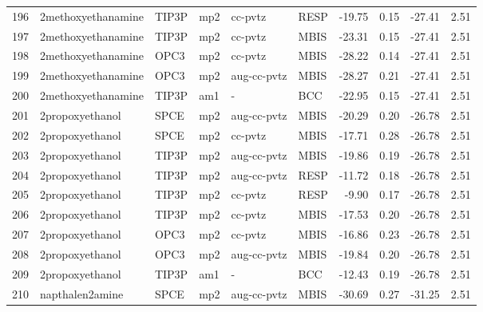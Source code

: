 \begin{tabular}{llllllrrrr}
196 &             2methoxyethanamine &      TIP3P &      mp2 &      cc-pvtz &         RESP & -19.75 &      0.15 &      -27.41 &     2.51 \\
197 &             2methoxyethanamine &      TIP3P &      mp2 &      cc-pvtz &         MBIS & -23.31 &      0.15 &      -27.41 &     2.51 \\
198 &             2methoxyethanamine &       OPC3 &      mp2 &      cc-pvtz &         MBIS & -28.22 &      0.14 &      -27.41 &     2.51 \\
199 &             2methoxyethanamine &       OPC3 &      mp2 &  aug-cc-pvtz &         MBIS & -28.27 &      0.21 &      -27.41 &     2.51 \\
200 &             2methoxyethanamine &      TIP3P &      am1 &            - &          BCC & -22.95 &      0.15 &      -27.41 &     2.51 \\
201 &                2propoxyethanol &       SPCE &      mp2 &  aug-cc-pvtz &         MBIS & -20.29 &      0.20 &      -26.78 &     2.51 \\
202 &                2propoxyethanol &       SPCE &      mp2 &      cc-pvtz &         MBIS & -17.71 &      0.28 &      -26.78 &     2.51 \\
203 &                2propoxyethanol &      TIP3P &      mp2 &  aug-cc-pvtz &         MBIS & -19.86 &      0.19 &      -26.78 &     2.51 \\
204 &                2propoxyethanol &      TIP3P &      mp2 &  aug-cc-pvtz &         RESP & -11.72 &      0.18 &      -26.78 &     2.51 \\
205 &                2propoxyethanol &      TIP3P &      mp2 &      cc-pvtz &         RESP &  -9.90 &      0.17 &      -26.78 &     2.51 \\
206 &                2propoxyethanol &      TIP3P &      mp2 &      cc-pvtz &         MBIS & -17.53 &      0.20 &      -26.78 &     2.51 \\
207 &                2propoxyethanol &       OPC3 &      mp2 &      cc-pvtz &         MBIS & -16.86 &      0.23 &      -26.78 &     2.51 \\
208 &                2propoxyethanol &       OPC3 &      mp2 &  aug-cc-pvtz &         MBIS & -19.84 &      0.20 &      -26.78 &     2.51 \\
209 &                2propoxyethanol &      TIP3P &      am1 &            - &          BCC & -12.43 &      0.19 &      -26.78 &     2.51 \\
210 &                napthalen2amine &       SPCE &      mp2 &  aug-cc-pvtz &         MBIS & -30.69 &      0.27 &      -31.25 &     2.51 \\

\end{tabular}
